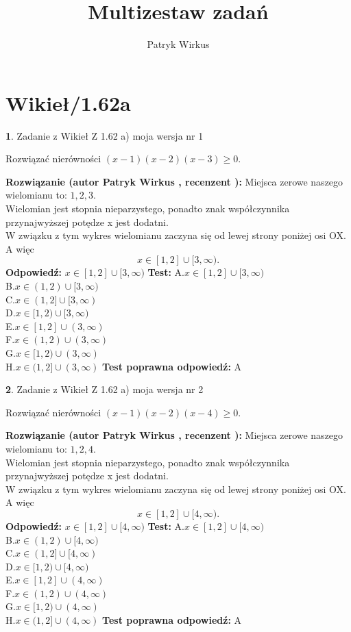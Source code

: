 \documentclass[12pt, a4paper]{article}
\title{Multizestaw zadań}
\author{Patryk Wirkus}
\date{}
\theoremstyle{definition} %
\newtheorem{zad}{}
\newcommand{\kategoria}[1]{\section{#1}}
\newcommand{\zadStart}[1]{\begin{zad}#1\newline}
\newcommand{\zadStop}{\end{zad}}
\newcommand{\rozwStart}[2]{\noindent \textbf{Rozwiązanie (autor #1 , recenzent #2): }\newline}
\newcommand{\rozwStop}{\newline}
\newcommand{\odpStart}{\noindent \textbf{Odpowiedź:}\newline}
\newcommand{\odpStop}{\newline}
\newcommand{\testStart}{\noindent \textbf{Test:}\newline}
\newcommand{\testStop}{\newline}
\newcommand{\kluczStart}{\noindent \textbf{Test poprawna odpowiedź:}\newline}
\newcommand{\kluczStop}{\newline}
\begin{document}
\maketitle

\kategoria{Wikieł/1.62a}


\zadStart{Zadanie z Wikieł Z 1.62 a) moja wersja nr 1}

Rozwiązać nierówności $(x-1)(x-2)(x-3)\ge0$.
\zadStop
\rozwStart{Patryk Wirkus}{}
Miejsca zerowe naszego wielomianu to: $1, 2, 3$.\\
Wielomian jest stopnia nieparzystego, ponadto znak współczynnika przy\linebreak najwyższej potędze x jest dodatni.\\ W związku z tym wykres wielomianu zaczyna się od lewej strony poniżej osi OX. A więc $$x \in [1,2] \cup [3,\infty).$$
\rozwStop
\odpStart
$x \in [1,2] \cup [3,\infty)$
\odpStop
\testStart
A.$x \in [1,2] \cup [3,\infty)$\\
B.$x \in (1,2) \cup [3,\infty)$\\
C.$x \in (1,2] \cup [3,\infty)$\\
D.$x \in [1,2) \cup [3,\infty)$\\
E.$x \in [1,2] \cup (3,\infty)$\\
F.$x \in (1,2) \cup (3,\infty)$\\
G.$x \in [1,2) \cup (3,\infty)$\\
H.$x \in (1,2] \cup (3,\infty)$
\testStop
\kluczStart
A
\kluczStop



\zadStart{Zadanie z Wikieł Z 1.62 a) moja wersja nr 2}

Rozwiązać nierówności $(x-1)(x-2)(x-4)\ge0$.
\zadStop
\rozwStart{Patryk Wirkus}{}
Miejsca zerowe naszego wielomianu to: $1, 2, 4$.\\
Wielomian jest stopnia nieparzystego, ponadto znak współczynnika przy\linebreak najwyższej potędze x jest dodatni.\\ W związku z tym wykres wielomianu zaczyna się od lewej strony poniżej osi OX. A więc $$x \in [1,2] \cup [4,\infty).$$
\rozwStop
\odpStart
$x \in [1,2] \cup [4,\infty)$
\odpStop
\testStart
A.$x \in [1,2] \cup [4,\infty)$\\
B.$x \in (1,2) \cup [4,\infty)$\\
C.$x \in (1,2] \cup [4,\infty)$\\
D.$x \in [1,2) \cup [4,\infty)$\\
E.$x \in [1,2] \cup (4,\infty)$\\
F.$x \in (1,2) \cup (4,\infty)$\\
G.$x \in [1,2) \cup (4,\infty)$\\
H.$x \in (1,2] \cup (4,\infty)$
\testStop
\kluczStart
A
\kluczStop
\end{document}
